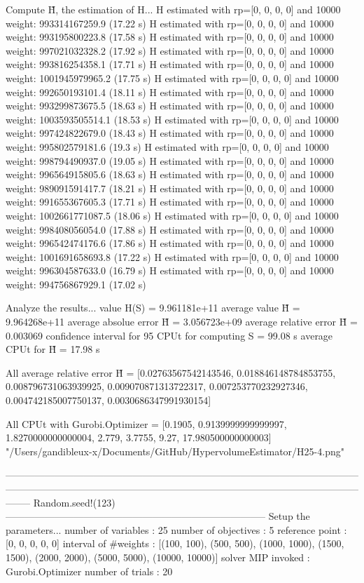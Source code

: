 Compute H̃, the estimation of H...
  H estimated with rp=[0, 0, 0, 0] and 10000 weight:  993314167259.9  (17.22 s)
  H estimated with rp=[0, 0, 0, 0] and 10000 weight:  993195800223.8  (17.58 s)
  H estimated with rp=[0, 0, 0, 0] and 10000 weight:  997021032328.2  (17.92 s)
  H estimated with rp=[0, 0, 0, 0] and 10000 weight:  993816254358.1  (17.71 s)
  H estimated with rp=[0, 0, 0, 0] and 10000 weight:  1001945979965.2  (17.75 s)
  H estimated with rp=[0, 0, 0, 0] and 10000 weight:  992650193101.4  (18.11 s)
  H estimated with rp=[0, 0, 0, 0] and 10000 weight:  993299873675.5  (18.63 s)
  H estimated with rp=[0, 0, 0, 0] and 10000 weight:  1003593505514.1  (18.53 s)
  H estimated with rp=[0, 0, 0, 0] and 10000 weight:  997424822679.0  (18.43 s)
  H estimated with rp=[0, 0, 0, 0] and 10000 weight:  995802579181.6  (19.3 s)
  H estimated with rp=[0, 0, 0, 0] and 10000 weight:  998794490937.0  (19.05 s)
  H estimated with rp=[0, 0, 0, 0] and 10000 weight:  996564915805.6  (18.63 s)
  H estimated with rp=[0, 0, 0, 0] and 10000 weight:  989091591417.7  (18.21 s)
  H estimated with rp=[0, 0, 0, 0] and 10000 weight:  991655367605.3  (17.71 s)
  H estimated with rp=[0, 0, 0, 0] and 10000 weight:  1002661771087.5  (18.06 s)
  H estimated with rp=[0, 0, 0, 0] and 10000 weight:  998408056054.0  (17.88 s)
  H estimated with rp=[0, 0, 0, 0] and 10000 weight:  996542474176.6  (17.86 s)
  H estimated with rp=[0, 0, 0, 0] and 10000 weight:  1001691658693.8  (17.22 s)
  H estimated with rp=[0, 0, 0, 0] and 10000 weight:  996304587633.0  (16.79 s)
  H estimated with rp=[0, 0, 0, 0] and 10000 weight:  994756867929.1  (17.02 s)

Analyze the results...
  value H(S)                  = 9.961181e+11 
  average value H̃             = 9.964268e+11 
  average absolue error H̃     = 3.056723e+09 
  average relative error H̃    = 0.003069 
  confidence interval for 95%
  CPUt for computing S         = 99.08 s
  average CPUt for H̃           = 17.98 s

All average relative error H̃ = [0.02763567542143546, 0.018846148784853755, 0.008796731063939925, 0.009070871313722317, 0.007253770232927346, 0.004742185007750137, 0.0030686347991930154]

All CPUt with Gurobi.Optimizer = [0.1905, 0.9139999999999997, 1.8270000000000004, 2.779, 3.7755, 9.27, 17.980500000000003]
"/Users/gandibleux-x/Documents/GitHub/HypervolumeEstimator/H25-4.png"

--------------------------------------------------------------------------------------------------------------------------------------------------------------------------------------------------------------------------------
Random.seed!(123)
--------------------------------------------------------------------------------
Setup the parameters...
  number of variables  : 25
  number of objectives : 5
  reference point      : [0, 0, 0, 0, 0]
  interval of #weights : [(100, 100), (500, 500), (1000, 1000), (1500, 1500), (2000, 2000), (5000, 5000), (10000, 10000)]
  solver MIP invoked   : Gurobi.Optimizer
  number of trials     : 20

